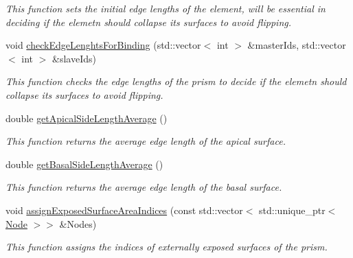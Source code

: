 \begin{DoxyCompactItemize}
\begin{DoxyCompactList}\small\item\em This function sets the initial edge lengths of the element, will be essential in deciding if the elemetn should collapse its surfaces to avoid flipping. \end{DoxyCompactList}\item 
void \hyperlink{classPrism_a0a57c74e857e937883bb4581cd982da1}{check\+Edge\+Lenghts\+For\+Binding} (std\+::vector$<$ int $>$ \&master\+Ids, std\+::vector$<$ int $>$ \&slave\+Ids)
\begin{DoxyCompactList}\small\item\em This function checks the edge lengths of the prism to decide if the elemetn should collapse its surfaces to avoid flipping. \end{DoxyCompactList}\item 
\hypertarget{classPrism_acc59ccf5e1b5f459a8fb871c2a78fe8e}{}double \hyperlink{classPrism_acc59ccf5e1b5f459a8fb871c2a78fe8e}{get\+Apical\+Side\+Length\+Average} ()\label{classPrism_acc59ccf5e1b5f459a8fb871c2a78fe8e}

\begin{DoxyCompactList}\small\item\em This function returns the average edge length of the apical surface. \end{DoxyCompactList}\item 
\hypertarget{classPrism_a628c31f0b9dbaa6a1fee8adb68cb6cd6}{}double \hyperlink{classPrism_a628c31f0b9dbaa6a1fee8adb68cb6cd6}{get\+Basal\+Side\+Length\+Average} ()\label{classPrism_a628c31f0b9dbaa6a1fee8adb68cb6cd6}

\begin{DoxyCompactList}\small\item\em This function returns the average edge length of the basal surface. \end{DoxyCompactList}\item 
\hypertarget{classPrism_af8c5d2fbf2d87550855a7ae958c82e13}{}void \hyperlink{classPrism_af8c5d2fbf2d87550855a7ae958c82e13}{assign\+Exposed\+Surface\+Area\+Indices} (const std\+::vector$<$ std\+::unique\+\_\+ptr$<$ \hyperlink{classNode}{Node} $>$$>$ \&Nodes)\label{classPrism_af8c5d2fbf2d87550855a7ae958c82e13}

\begin{DoxyCompactList}\small\item\em This function assigns the indices of externally exposed surfaces of the prism. \end{DoxyCompactList}\end{DoxyCompactItemize}
